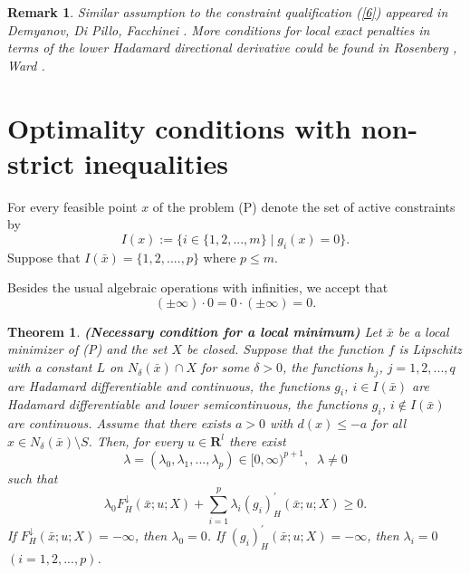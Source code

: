 \documentclass[12pt]{article}
\newtheorem{theorem}{Theorem}[section]
\newtheorem{remark}{Remark}[section]
\def\R{\mathbf R}
\def\E{\mathbf R^l}
\def\ld#1{#1^{\downarrow}_{H}}
\def\d#1{#1^{\prime}_{H}}
\begin{document}
\begin{remark}
Similar assumption to the constraint qualification (\ref{6}) appeared in 
Demyanov, Di Pillo, Facchinei \cite{dem98}. 
More conditions for local exact penalties in terms of the lower Hadamard
directional derivative could be found in Rosenberg \cite[Theorem 3]{ros84},
Ward \cite[Theorem 4.1]{war88}.
\end{remark}






\section{Optimality conditions with non-strict inequalities}
\label{s3}


For every feasible point $x$ of the problem (P) denote the set
of active constraints by
\[
I(x):=\{i\in\{1,2,...,m\}\mid g_i(x)=0\}.
\]
Suppose that $I(\bar x)=\{1,2,....,p\}$ where $p\le m$.

Besides the usual algebraic operations with infinities,
we accept that 
$$(\pm\infty)\cdot 0=0\cdot (\pm\infty)=0.$$

\begin{theorem}
{\bf (Necessary condition for a local minimum)}
Let $\bar x$ be a local minimizer of {\rm (P)} and the set $X$ be closed.
Suppose that the function $f$ is Lipschitz with a constant $L$
on $N_\delta(\bar x)\cap X$ for some $\delta>0$, the functions $h_j$,
$j=1,2,...,q$ are Hadamard differentiable and continuous,
the functions $g_i$, $i\in I(\bar x)$ are Hadamard differentiable and lower
semicontinuous, the functions $g_i$, $i\notin I(\bar x)$ are continuous.
Assume that there exists $a>0$ with $d(x)\le -a$ for all
$x\in N_\delta(\bar x)\setminus S$. Then, for every $u\in\E$
there exist
\[
\lambda=(\lambda_0,\lambda_1,...,\lambda_p)\in[0,\infty)^{p+1}, \;\;\lambda\ne 0
\]
such that
\begin{equation}\label{lagrange}
\lambda_0\ld F(\bar x;u;X)+\sum_{i=1}^p\lambda_i\d {(g_i)} (\bar x;u;X)\ge 0.
\end{equation}
If $\ld F (\bar x;u;X)=-\infty$, then $\lambda_0=0$.
If $\d {(g_i)} (\bar x;u;X)=-\infty$, then $\lambda_i=0$  $(i=1,2,...,p)$.
\end{theorem}
\end{document}

